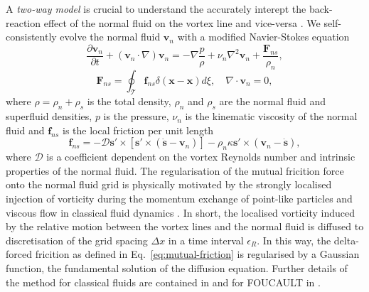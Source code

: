 \documentclass[%
 reprint,
 amsmath,amssymb,
 aps,
 prl,
]{revtex4-2}
\def \s{\mathbf{s}}
\def \v{\mathbf{v}}
\def \x{\mathbf{x}}
\begin{document}
{A \emph{two-way model} is crucial to understand the accurately interept the back-reaction effect of the normal fluid on the vortex line and vice-versa \cite{stasiak2024quantum}. We self-consistently evolve the normal fluid $\v_n$ with a modified Navier-Stokes equation
\begin{equation}
	\frac{\partial \v_n}{\partial t} + (\v_n\cdot\nabla)\v_n = -\nabla\frac{p}{\rho} + \nu_n\nabla^2\v_n + \frac{\mathbf{F}_{ns}}{\rho_n},
\end{equation}
\begin{equation}
	\mathbf{F}_{ns} = \oint_{\mathcal{T}}\mathbf{f}_{ns}\delta(\x-\x)d\xi, \quad \nabla\cdot\v_n=0,
\end{equation}
where $\rho=\rho_n + \rho_s$ is the total density, $\rho_n$ and $\rho_s$ are the normal fluid and superfluid densities, $p$ is the pressure, $\nu_n$ is the kinematic viscosity of the normal fluid and $\mathbf{f}_{ns}$ is the local friction per unit length \cite{galantucciCoupledNormalFluid2015a}
\begin{equation}
	\mathbf{f}_{ns} = -\mathcal{D}\s'\times\left[\s'\times(\dot{\s}-\v_n)\right]-\rho_n\kappa\s'\times(\v_n-\dot{\s}), 
	\label{eq:mutual-friction}
\end{equation}
where $\mathcal{D}$ is a coefficient dependent on the vortex Reynolds number and intrinsic properties of the normal fluid. The regularisation of the mutual fricition force onto the normal fluid grid is physically motivated by the strongly localised injection of vorticity during the momentum exchange of point-like particles and viscous flow in classical fluid dynamics \cite{gualtieri2015exact,gualtieri2017turbulence}. In short, the localised vorticity induced by the relative motion between the vortex lines and the normal fluid is diffused to discretisation of the grid spacing $\Delta x$ in a time interval $\epsilon_R$. In this way, the delta-forced fricition as defined in Eq.~\ref{eq:mutual-friction} is regularised by a Gaussian function, the fundamental solution of the diffusion equation. Further details of the method for classical fluids are contained in \cite{gualtieri2015exact,gualtieri2017turbulence} and for FOUCAULT in \cite{galantucciNewSelfconsistentApproach2020b}.  



}
\end{document}

